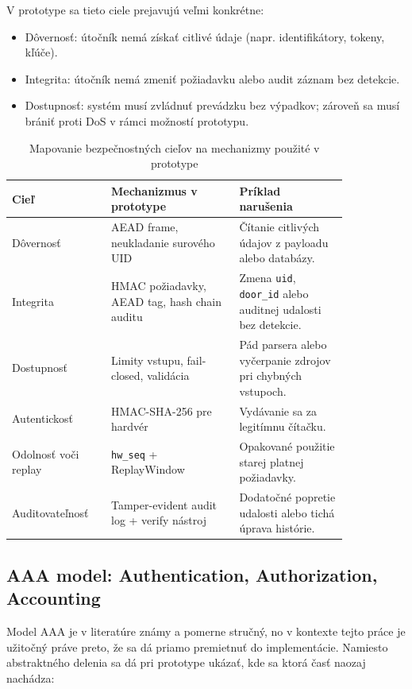 \documentclass[journal,a4paper,onecolumn]{IEEEtran}
\begin{document}
V prototype sa tieto ciele prejavujú veľmi konkrétne:

\begin{itemize}[leftmargin=*,itemsep=2pt]
  \item Dôvernosť: útočník nemá získať citlivé údaje (napr. identifikátory, tokeny, kľúče).
  \item Integrita: útočník nemá zmeniť požiadavku alebo audit záznam bez detekcie.
  \item Dostupnosť: systém musí zvládnuť prevádzku bez výpadkov; zároveň sa musí brániť proti DoS v rámci možností prototypu.
\end{itemize}


\begin{table}[!ht]
\centering
\caption{Mapovanie bezpečnostných cieľov na mechanizmy použité v prototype}
\label{tab:security_mapping}
\small
\begin{tabular}{p{0.22\linewidth} p{0.33\linewidth} p{0.29\linewidth}}
\toprule
\textbf{Cieľ} & \textbf{Mechanizmus v prototype} & \textbf{Príklad narušenia} \\
\midrule
Dôvernosť & AEAD frame, neukladanie surového UID & Čítanie citlivých údajov z payloadu alebo databázy. \\
Integrita & HMAC požiadavky, AEAD tag, hash chain auditu & Zmena \texttt{uid}, \texttt{door\_id} alebo auditnej udalosti bez detekcie. \\
Dostupnosť & Limity vstupu, fail-closed, validácia & Pád parsera alebo vyčerpanie zdrojov pri chybných vstupoch. \\
Autentickosť & HMAC-SHA-256 pre hardvér & Vydávanie sa za legitímnu čítačku. \\
Odolnosť voči replay & \texttt{hw\_seq} + ReplayWindow & Opakované použitie starej platnej požiadavky. \\
Auditovateľnosť & Tamper-evident audit log + verify nástroj & Dodatočné popretie udalosti alebo tichá úprava histórie. \\
\bottomrule
\end{tabular}
\normalsize
\end{table}

\subsection{AAA model: Authentication, Authorization, Accounting}

Model AAA je v literatúre známy a pomerne stručný, no v kontexte tejto práce je užitočný práve preto, že sa dá priamo premietnuť do implementácie. Namiesto abstraktného delenia sa dá pri prototype ukázať, kde sa ktorá časť naozaj nachádza:
\end{document}
